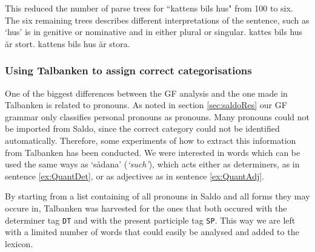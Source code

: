 \documentclass{report}
\begin{document}
This reduced the number of parse trees for ``kattens bils hus" from 100 to six.
The six remaining trees describes different interpretations of the sentence,
such as `hus' is in genitive or nominative and in either plural or singular.
kattes bils hus är stort.
kattens bils hus är stora.



\subsubsection{Using Talbanken to assign correct categorisations}
\label{sec:gf.quant}
One of the biggest differences between the GF analysis and the one made in Talbanken
is related to pronouns. 
As noted in section \ref{sec:saldoRes} our GF grammar only classifies personal pronouns
as pronouns. Many pronouns could not be imported from Saldo, since the correct category
could not be identified automatically. Therefore, some experiments of how to extract this 
information from Talbanken has been conducted. We were interested in words which can be used
the same ways as `sådana' (\emph{`such'}), which acts either as
determiners, as in sentence \ref{ex:QuantDet}, or as adjectives as
 in sentence \ref{ex:QuantAdj}. 

By starting from a list containing of all pronouns  in Saldo and all forms they may occure in,
Talbanken was harvested for the ones that both occured with the determiner tag \verb-DT-
and with the present participle tag \verb-SP-. This way we are left with a limited number
of words that could easily be analysed and added to the lexicon.
\end{document}

